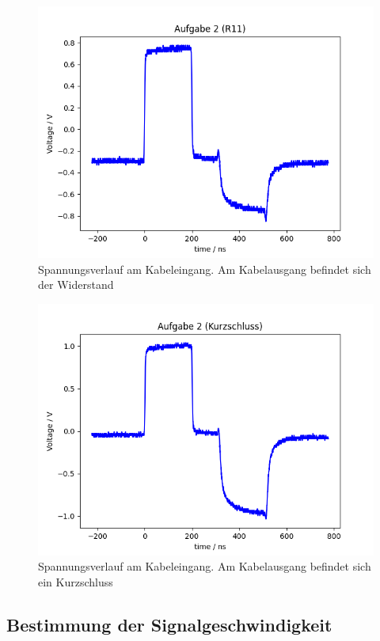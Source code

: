 \documentclass{article}
\begin{document}
\begin{figure}[H]
\centering
\caption{Spannungsverlauf am Kabeleingang. Am Kabelausgang befindet sich der Widerstand }
\label{fig:task2_R11}
\includegraphics[scale=0.6]{bilder/task2/task2_R11.png}
\end{figure}


\begin{figure}[H]
\centering
\caption{Spannungsverlauf am Kabeleingang. Am Kabelausgang befindet sich ein Kurzschluss}
\label{fig:task2_kurz}
\includegraphics[scale=0.6]{bilder/task2/task2_kurz.png}
\end{figure}




\subsection{Bestimmung der Signalgeschwindigkeit}
\end{document}
